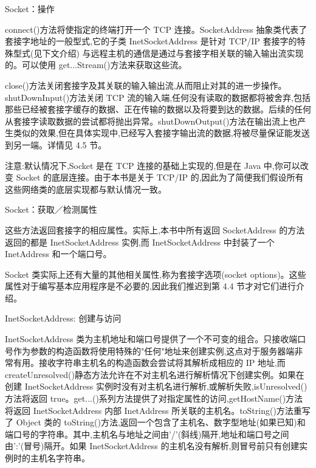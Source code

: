 		Socket：操作

		

		connect()方法将使指定的终端打开一个 TCP 连接。SocketAddress 抽象类代表了套接字地址的一般型式,它的子类 InetSocketAddress 是针对 TCP/IP 套接字的特殊型式(见下文介绍) 与远程主机的通信是通过与套接字相关联的输入输出流实现的。可以使用 get...Stream()方法来获取这些流。

		close()方法关闭套接字及其关联的输入输出流,从而阻止对其的进一步操作。shutDownInput()方法关闭 TCP 流的输入端,任何没有读取的数据都将被舍弃,包括那些已经被套接字缓存的数据、正在传输的数据以及将要到达的数据。后续的任何从套接字读取数据的尝试都将抛出异常。shutDownOutput()方法在输出流上也产生类似的效果,但在具体实现中,已经写入套接字输出流的数据,将被尽量保证能发送到另一端。详情见 4.5 节。

		注意:默认情况下,Socket 是在 TCP 连接的基础上实现的,但是在 Java 中,你可以改变 Socket 的底层连接。由于本书是关于 TCP/IP 的,因此为了简便我们假设所有这些网络类的底层实现都与默认情况一致。

		Socket：获取／检测属性

		

		这些方法返回套接字的相应属性。实际上,本书中所有返回 SocketAddress 的方法返回的都是 InetSocketAddress 实例,而 InetSocketAddress 中封装了一个 InetAddress 和一个端口号。

		Socket 类实际上还有大量的其他相关属性,称为套接字选项(socket options)。这些属性对于编写基本应用程序是不必要的,因此我们推迟到第 4.4 节才对它们进行介绍。

		InetSocketAddress: 创建与访问

		


		InetSocketAddress 类为主机地址和端口号提供了一个不可变的组合。只接收端口号作为参数的构造函数将使用特殊的"任何"地址来创建实例,这点对于服务器端非常有用。接收字符串主机名的构造函数会尝试将其解析成相应的 IP 地址,而 createUnresolved()静态方法允许在不对主机名进行解析情况下创建实例。如果在创建 InetSocketAddress 实例时没有对主机名进行解析,或解析失败,isUnresolved()方法将返回 true。get...()系列方法提供了对指定属性的访问,getHostName()方法将返回 InetSocketAddress 内部 InetAddress 所关联的主机名。toString()方法重写了 Object 类的 toString()方法,返回一个包含了主机名、数字型地址(如果已知)和端口号的字符串。其中,主机名与地址之间由'/'(斜线)隔开,地址和端口号之间由':'(冒号)隔开。如果 InetSocketAddress 的主机名没有解析,则冒号前只有创建实例时的主机名字符串。

